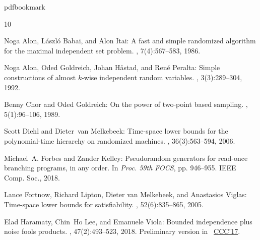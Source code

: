 \newcommand{\prelim}{Preliminary version in\ }\newcommand{\prelims}{Preliminary
  versions in\ }
\providecommand{\bibhead}[1]{}
\expandafter\ifx\csname pdfbookmark\endcsname\relax%
  \providecommand{\tocrefpdfbookmark}{}
\else\providecommand{\tocrefpdfbookmark}{%
   \hypertarget{tocreferences}{}%
   \pdfbookmark[1]{References}{tocreferences}}%
\fi

\tocrefpdfbookmark
\begin{thebibliography}{10}

\bibhead{ABI86}
{\sc Noga Alon, L{\'a}szl{\'o} Babai, and Alon Itai}: A fast and simple
  randomized algorithm for the maximal independent set problem.
, 7(4):567--583, 1986.
\newblock [\epfmtdoi{10.1016/0196-6774(86)90019-2}]

\bibhead{AGHP92}
{\sc Noga Alon, Oded Goldreich, Johan H{\aa}stad, and Ren{\'e} Peralta}: Simple
  constructions of almost {$k$}-wise independent random variables.
, 3(3):289--304, 1992.

\bibhead{ChG89}
{\sc Benny Chor and Oded Goldreich}: On the power of two-point based sampling.
, 5(1):96--106, 1989.
\newblock [\epfmtdoi{10.1016/0885-064X(89)90015-0}]

\bibhead{DvM06}
{\sc Scott Diehl and Dieter~van Melkebeek}: Time-space lower bounds for the
  polynomial-time hierarchy on randomized machines.
, 36(3):563--594, 2006.
\newblock [\epfmtdoi{10.1137/050642228}]

\bibhead{ForbesKelley-2018}
{\sc Michael~A. Forbes and Zander Kelley}: Pseudorandom generators for
  read-once branching programs, in any order.
\newblock In {\em Proc. 59th FOCS}, pp. 946--955. IEEE Comp. Soc., 2018.

\bibhead{FLvMV05}
{\sc Lance Fortnow, Richard Lipton, Dieter van Melkebeek, and Anastasios
  Viglas}: Time-space lower bounds for satisfiability.
, 52(6):835--865, 2005.
\newblock [\epfmtdoi{10.1145/1101821.1101822}]

\bibhead{HLV-bipnfp}
{\sc Elad Haramaty, Chin~Ho Lee, and Emanuele Viola}: Bounded independence plus
  noise fools products.
, 47(2):493--523, 2018.
\newblock \prelim
  \href{https://dl.acm.org/doi/10.5555/3135595.3135609}{CCC'17}.
\newblock [\epfmtdoi{10.1137/17M1129088}]


\end{thebibliography}
